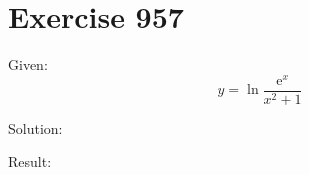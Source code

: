 \documentclass[a4paper, 10pt]{scrartcl}
\newcommand*\euler{\mathrm{e}}
\begin{document}
\section{Exercise 957}

Given:
\[
y = \ln{\frac{\euler^{x}}{x^{2} + 1}}
\]

Solution:

Result:
\end{document}
